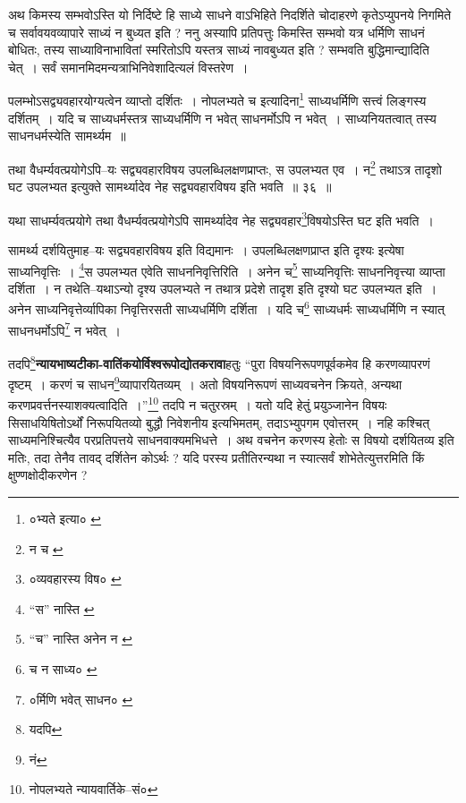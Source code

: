 \documentclass[article,12pt,a4paper]{memoir}
\begin{document}
	  \pstart अथ किमस्य सम्भवोऽस्ति यो निर्दिष्टे हि साध्ये साधने वाऽभिहिते निदर्शिते चोदाहरणे कृतेऽप्युपनये निगमिते च सर्वावयवव्यापारे साध्यं न बुध्यत इति ? ननु अस्यापि प्रतिपत्तुः किमस्ति सम्भवो यत्र धर्मिणि साधनं बोधितः, तस्य साध्याविनाभावितां स्मरितोऽपि यस्तत्र साध्यं नावबुध्यत इति ? सम्भवति बुद्धिमान्द्यादिति चेत् । सर्वं समानमिदमन्यत्राभिनिवेशादित्यलं विस्तरेण ।
	\pend
	  \bigskip
	  \begingroup
	

	  \pstart पलम्भोऽसद्व्यवहारयोग्यत्वेन व्याप्तो दर्शितः । नोपलभ्यते च इत्यादिना\footnote{०भ्यते इत्या० \cite{dp-msA} \cite{dp-msB} \cite{dp-edP} \cite{dp-edH} \cite{dp-edN}} साध्यधर्मिणि सत्त्वं लिङ्गस्य दर्शितम् । यदि च साध्यधर्मस्तत्र साध्यधर्मिणि न भवेत् साधनर्मोऽपि न भवेत् । साध्यनियतत्वात् तस्य साधनधर्मस्येति सामर्थ्यम ॥
	\pend
       
	  \bigskip
	  \begingroup
	

	  \pstart तथा वैधर्म्यवत्प्रयोगेऽपि--यः सद्व्यवहारविषय उपलब्धिलक्षणप्राप्तः, स उपलभ्यत एव । न\footnote{न च \cite{dp-msC}} तथाऽत्र तादृशो घट उपलभ्यत इत्युक्ते सामर्थ्यादेव नेह सद्व्यवहारविषय इति भवति ॥ ३६ ॥
	\pend
      
	  \endgroup
	 

	  \pstart यथा साधर्म्यवत्प्रयोगे तथा वैधर्म्यवत्प्रयोगेऽपि सामर्थ्यादेव नेह सद्व्यवहार\footnote{०व्यवहारस्य विष० \cite{dp-msC} \cite{dp-msD}}\-विषयोऽस्ति घट इति भवति ।
	\pend
       

	  \pstart सामर्थ्य दर्शयितुमाह--यः सद्व्यवहारविषय इति विद्यमानः । उपलब्धिलक्षणप्राप्त इति दृश्यः इत्येषा साध्यनिवृत्तिः । \footnote{“स” नास्ति \cite{dp-msA} \cite{dp-msB} \cite{dp-msC} \cite{dp-msD} \cite{dp-edP} \cite{dp-edH}}\-स उपलभ्यत एवेति साधननिवृत्तिरिति । अनेन च\footnote{“च” नास्ति \cite{dp-msC} \cite{dp-edE} अनेन न \cite{dp-edH}} साध्यनिवृत्तिः साधननिवृत्त्या व्याप्ता दर्शिता । न तथेति--यथाऽन्यो दृश्य उपलभ्यते न तथात्र प्रदेशे तादृश इति दृश्यो घट उपलभ्यत इति । अनेन साध्यनिवृत्तेर्व्यापिका निवृत्तिरसती साध्यधर्मिणि दर्शिता । यदि च\footnote{च न साध्य० \cite{dp-msA} \cite{dp-msB} \cite{dp-edP} \cite{dp-edH} \cite{dp-edN}} साध्यधर्मः साध्यधर्मिणि न स्यात् साधनधर्मोऽपि\footnote{०र्मिणि भवेत् साधन० \cite{dp-msA} \cite{dp-msB} \cite{dp-edP} \cite{dp-edH} \cite{dp-edE} \cite{dp-edN}} न भवेत् ।
	\pend
      
	  \endgroup
	

	  \pstart तदपि\footnote{यदपि}\textbf{न्यायभाष्यटीका-वातिंकयोर्विश्वरूपोद्योतकरावा}हतुः “पुरा विषयनिरूपणपूर्वकमेव हि करणव्यापरणं दृष्टम् । करणं च साधन\footnote{नं}\-व्यापारयितव्यम् । अतो विषयनिरूपणं साध्यवचनेन क्रियते, अन्यथा करणप्रवर्त्तनस्याशक्यत्वादिति ।”\footnote{नोपलभ्यते न्यायवार्तिके--सं०} तदपि न चतुरस्रम् । यतो यदि हेतुं प्रयुञ्जानेन विषयः सिसाधयिषितोऽर्थों निरूपयितव्यो बुद्धौ निवेशनीय इत्यभिमतम्, तदाऽभ्युपगम एवोत्तरम् । नहि कश्चित् साध्यमनिश्चित्यैव परप्रतिपत्तये साधनवाक्यमभिधत्ते । अथ वचनेन करणस्य हेतोः स विषयो दर्शयितव्य इति मतिः, तदा तेनैव तावद् दर्शितेन कोऽर्थः ? यदि परस्य प्रतीतिरन्यथा न स्यात्सर्वं शोभेतेत्युत्तरमिति किं क्षुण्णक्षोदीकरणेन ?
	\pend
      
\end{document}

